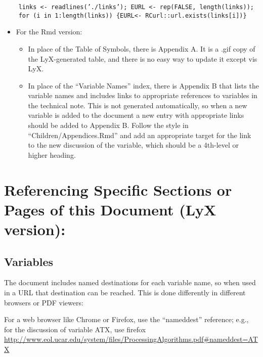 \documentclass[
  english,
]{book}
\providecommand{\tightlist}{%
  \setlength{\itemsep}{0pt}\setlength{\parskip}{0pt}}
\begin{document}
\begin{verbatim}
    links <- readlines(’./links’); EURL <- rep(FALSE, length(links));
    for (i in 1:length(links)) {EURL<- RCurl::url.exists(links[i])}
\end{verbatim}

\begin{itemize}
\tightlist
\item
  For the Rmd version:

  \begin{itemize}
  \tightlist
  \item
    In place of the Table of Symbols, there is Appendix A. It is a .gif
    copy of the LyX-generated table, and there is no easy way to update
    it except vis LyX.
  \item
    In place of the ``Variable Names'' index, there is Appendix B that
    lists the variable names and includes links to appropriate
    references to variables in the technical note. This is not generated
    automatically, so when a new variable is added to the document a new
    entry with appropriate links should be added to Appendix B. Follow
    the style in ``Children/Appendices.Rmd'' and add an appropriate
    target for the link to the new discussion of the variable, which
    should be a 4th-level or higher heading.
  \end{itemize}
\end{itemize}

\hypertarget{referencing-specific-sections-or-pages-of-this-document-lyx-version}{%
\section*{Referencing Specific Sections or Pages of this Document (LyX
version):}\label{referencing-specific-sections-or-pages-of-this-document-lyx-version}}

\hypertarget{variables}{%
\subsection*{Variables}\label{variables}}

The document includes named destinations for each variable name, so when
used in a URL that destination can be reached. This is done differently
in different browsers or PDF viewers:

For a web browser like Chrome or Firefox, use the ``nameddest''
reference; e.g., for the discussion of variable ATX, use firefox
\url{http://www.eol.ucar.edu/system/files/ProcessingAlgorithms.pdf\#nameddest=ATX}
\end{document}
